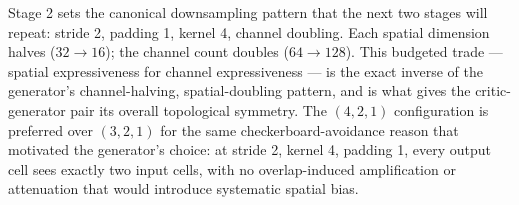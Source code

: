 
Stage 2 sets the canonical downsampling pattern that the next two
stages will repeat: stride 2, padding 1, kernel 4, channel doubling.
Each spatial dimension halves ($32 \to 16$); the channel count doubles
($64 \to 128$). This budgeted trade --- spatial expressiveness for
channel expressiveness --- is the exact inverse of the generator's
channel-halving, spatial-doubling pattern, and is what gives the
critic-generator pair its overall topological symmetry. The $(4, 2, 1)$
configuration is preferred over $(3, 2, 1)$ for the same
checkerboard-avoidance reason that motivated the generator's choice: at
stride 2, kernel 4, padding 1, every output cell sees exactly two input
cells, with no overlap-induced amplification or attenuation that would
introduce systematic spatial bias.
